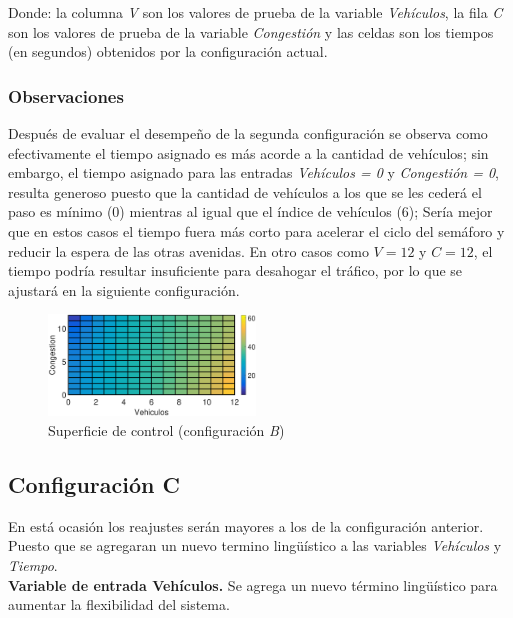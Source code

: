Donde: la columna \textit{V} son los valores de prueba de la variable \textit{Vehículos}, la fila \textit{C} son los valores de  prueba de la variable \textit{Congestión} y las celdas son los tiempos (en segundos) obtenidos por la configuración actual.

\subsubsection{Observaciones}
\begin{multicols}{2}
Después de evaluar el desempeño de la segunda configuración se observa como efectivamente el tiempo asignado es más acorde a la cantidad de vehículos; sin embargo, el tiempo asignado para las entradas \textit{Vehículos = 0} y \textit{Congestión = 0}, resulta generoso puesto que la cantidad de vehículos a los que se les cederá el paso es mínimo (0) mientras al igual que el índice de vehículos (6); Sería mejor que en estos casos el tiempo fuera más corto para acelerar el ciclo del semáforo y reducir la espera de las otras avenidas. En otro casos como $V = 12$ y $C = 12$, el tiempo podría resultar insuficiente para desahogar el tráfico, por lo que se ajustará en la siguiente configuración.

\begin{figure}[H]
	\includegraphics[width=0.49\textwidth]{Surfaces/Surface2D_B.eps}
	\caption{Superficie de control (configuración \textit{B})}
\end{figure}

\end{multicols}


\pagebreak
\subsection{Configuración C}
En está ocasión los reajustes serán mayores a los de la configuración anterior. Puesto que se agregaran un nuevo termino lingüístico a las variables \textit{Vehículos} y \textit{Tiempo}.\\

\textbf{Variable de entrada Vehículos.} Se agrega un nuevo término lingüístico para aumentar la flexibilidad del sistema.\\

